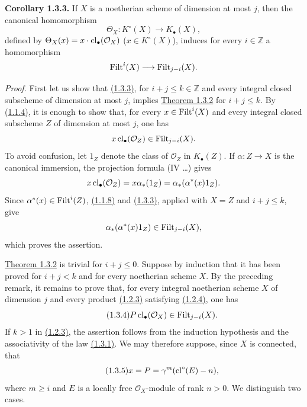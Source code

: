 \textbf{Corollary 1.3.3.}
If $X$ is a noetherian scheme of dimension at most $j$, then the canonical
homomorphism
\[
\Theta_X:K^\circ(X)\longrightarrow K_\bullet(X),
\]
defined by $\Theta_X(x)=x\cdot\operatorname{cl}_\bullet(\mathcal O_X)$
($x\in K^\circ(X)$), induces for every $i\in\mathbb Z$ a homomorphism
\[
\operatorname{Filt}^i(X)\longrightarrow\operatorname{Filt}_{j-i}(X).
\]

\emph{Proof.}
First let us show that \hyperlink{sga6.e10.cor.1-3-3}{(1.3.3)}, for $i+j\leq k\in\mathbb Z$ and every integral
closed subscheme of dimension at most $j$, implies \hyperlink{sga6.e10.thm.1-3-2}{Theorem 1.3.2} for
$i+j\leq k$. By \hyperlink{sga6.e10.cor.1-1-4}{(1.1.4)}, it is enough to show that, for every
$x\in\operatorname{Filt}^i(X)$ and every integral closed subscheme $Z$ of dimension at most
$j$, one has
\[
x\operatorname{cl}_\bullet(\mathcal O_Z)\in\operatorname{Filt}_{j-i}(X).
\]
To avoid confusion, let $1_Z$ denote the class of $\mathcal O_Z$ in
$K_\bullet(Z)$. If $\alpha:Z\to X$ is the canonical immersion, the projection
formula (IV \ldots) gives
\[
x\operatorname{cl}_\bullet(\mathcal O_Z)
=x\alpha_*(1_Z)
=\alpha_*(\alpha^*(x)1_Z).
\]
Since $\alpha^*(x)\in\operatorname{Filt}^i(Z)$, \hyperlink{sga6.e10.prop.1-1-8}{(1.1.8)} and \hyperlink{sga6.e10.cor.1-3-3}{(1.3.3)}, applied with $X=Z$
and $i+j\leq k$, give
\[
\alpha_*(\alpha^*(x)1_Z)\in\operatorname{Filt}_{j-i}(X),
\]
which proves the assertion.

\hyperlink{sga6.e10.thm.1-3-2}{Theorem 1.3.2} is trivial for $i+j\leq0$. Suppose by induction that it has been
proved for $i+j<k$ and for every noetherian scheme $X$. By the preceding
remark, it remains to prove that, for every integral noetherian scheme $X$ of
dimension $j$ and every product \hyperlink{sga6.e10.eq.1-2-3}{(1.2.3)} satisfying \hyperlink{sga6.e10.eq.1-2-4}{(1.2.4)}, one has
\begin{equation}\tag{1.3.4}
P\operatorname{cl}_\bullet(\mathcal O_X)\in\operatorname{Filt}_{j-i}(X).
\end{equation}
If $k>1$ in \hyperlink{sga6.e10.eq.1-2-3}{(1.2.3)}, the assertion follows from the induction hypothesis and
the associativity of the law \hyperlink{sga6.e10.eq.1-3-1}{(1.3.1)}. We may therefore suppose, since $X$ is
connected, that
\begin{equation}\tag{1.3.5}
x=P=\gamma^m(\operatorname{cl}^\circ(E)-n),
\end{equation}
where $m\geq i$ and $E$ is a locally free $\mathcal O_X$-module of rank
$n>0$. We distinguish two cases.

